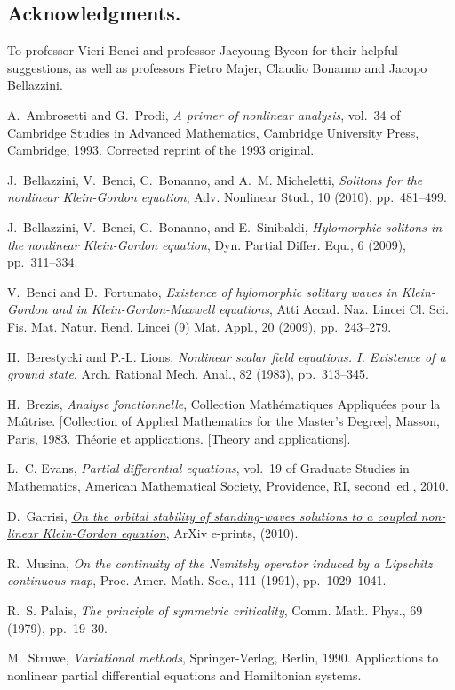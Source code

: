 \documentclass[a4paper,12pt,oneside]{amsart}
\theoremstyle{definition}
\theoremstyle{remark}
\theoremstyle{theorem}
\begin{document}
\subsection*{Acknowledgments.}
To professor Vieri Benci and professor Jaeyoung Byeon for their helpful 
suggestions, as well as professors Pietro Majer, Claudio Bonanno and 
Jacopo Bellazzini. 
\nocite{Mus91}
   
     
   
\begin{thebibliography}{10}

{\sc A.~Ambrosetti and G.~Prodi}, {\em A primer of nonlinear analysis}, vol.~34
  of Cambridge Studies in Advanced Mathematics, Cambridge University Press,
  Cambridge, 1993.
\newblock Corrected reprint of the 1993 original.

{\sc J.~Bellazzini, V.~Benci, C.~Bonanno, and A.~M. Micheletti}, {\em Solitons
  for the nonlinear {K}lein-{G}ordon equation}, Adv. Nonlinear Stud., 10
  (2010), pp.~481--499.

{\sc J.~Bellazzini, V.~Benci, C.~Bonanno, and E.~Sinibaldi}, {\em Hylomorphic
  solitons in the nonlinear {K}lein-{G}ordon equation}, Dyn. Partial Differ.
  Equ., 6 (2009), pp.~311--334.

{\sc V.~Benci and D.~Fortunato}, {\em Existence of hylomorphic solitary waves
  in {K}lein-{G}ordon and in {K}lein-{G}ordon-{M}axwell equations}, Atti Accad.
  Naz. Lincei Cl. Sci. Fis. Mat. Natur. Rend. Lincei (9) Mat. Appl., 20 (2009),
  pp.~243--279.

{\sc H.~Berestycki and P.-L. Lions}, {\em Nonlinear scalar field equations.
  {I}. {E}xistence of a ground state}, Arch. Rational Mech. Anal., 82 (1983),
  pp.~313--345.

{\sc H.~Brezis}, {\em Analyse fonctionnelle}, Collection Math\'ematiques
  Appliqu\'ees pour la Ma\^\i trise. [Collection of Applied Mathematics for the
  Master's Degree], Masson, Paris, 1983.
\newblock Th{\'e}orie et applications. [Theory and applications].

{\sc L.~C. Evans}, {\em Partial differential equations}, vol.~19 of Graduate
  Studies in Mathematics, American Mathematical Society, Providence, RI,
  second~ed., 2010.

{\sc D.~{Garrisi}}, {\em \href{http://arxiv.org/abs/1009.2281}{On the orbital
  stability of standing-waves solutions to a coupled non-linear Klein-Gordon
  equation}}, ArXiv e-prints,  (2010).

{\sc R.~Musina}, {\em On the continuity of the {N}emitsky operator induced by a
  {L}ipschitz continuous map}, Proc. Amer. Math. Soc., 111 (1991),
  pp.~1029--1041.

{\sc R.~S. Palais}, {\em The principle of symmetric criticality}, Comm. Math.
  Phys., 69 (1979), pp.~19--30.

{\sc M.~Struwe}, {\em Variational methods}, Springer-Verlag, Berlin, 1990.
\newblock Applications to nonlinear partial differential equations and
  Hamiltonian systems.

\end{thebibliography}
\end{document}
